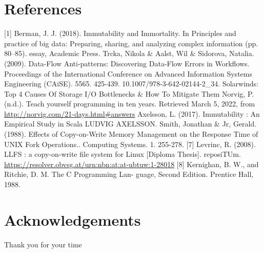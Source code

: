 \documentclass[12pt,twoside]{article}
\begin{document}
\section*{References}
[1] Berman, J. J. (2018). Immutability and Immortality. In Principles and practice of big data: Preparing, sharing, and analyzing complex information (pp. 80–85). essay, Academic Press. \newline
[2] Trcka, Nikola \& Aalst, Wil \& Sidorova, Natalia. (2009). Data-Flow Anti-patterns: Discovering Data-Flow Errors in Workflows. Proceedings of the International Conference on Advanced Information Systems Engineering (CAiSE). 5565. 425-439. 10.1007/978-3-642-02144-2_34. \newline
[3] Solarwinds: Top 4 Causes Of Storage I/O Bottlenecks \& How To Mitigate Them \newline
[4] Norvig, P. (n.d.). Teach yourself programming in ten years. Retrieved March 5, 2022, from \url{http://norvig.com/21-days.html#answers} \newline
[5] Axelsson, L. (2017). Immutability : An Empirical Study in Scala LUDVIG AXELSSON. \newline 
[6] Smith, Jonathan \& Jr, Gerald. (1988). Effects of Copy-on-Write Memory Management on the Response Time of UNIX Fork Operations.. Computing Systems. 1. 255-278.
[7] Levrinc, R. (2008). LLFS : a copy-on-write file system for Linux [Diploma Thesis]. reposiTUm. \url{https://resolver.obvsg.at/urn:nbn:at:at-ubtuw:1-28018}
[8] Kernighan, B. W., and Ritchie, D. M. The C Programming Lan-
guage, Second Edition. Prentice Hall, 1988.





\section*{Acknowledgements}
Thank you for your time

\printbibliography
\end{document}
